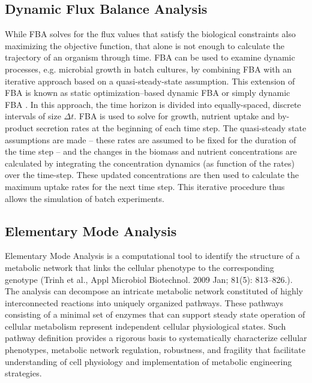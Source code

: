 \subsection{Dynamic Flux Balance Analysis}
While FBA solves for the flux values that satisfy the biological constraints also maximizing the objective function, that alone is not enough to calculate the trajectory of an organism through time. FBA can be used to examine dynamic processes, e.g. microbial growth in batch cultures, by combining FBA with an iterative approach based on a quasi-steady-state assumption. This extension of FBA is known as static optimization–based dynamic FBA or simply dynamic FBA \cite{Becker07}. In this approach, the time horizon is divided into equally-spaced, discrete intervals of size $\Delta t$. FBA is used to solve for growth, nutrient uptake and by-product secretion rates at the beginning of each time step. The quasi-steady state assumptions are made -- these rates are assumed to be fixed for the duration of the time step -- and the changes in the biomass and nutrient concentrations are calculated by integrating the concentration dynamics (as function of the rates) over the time-step. These updated concentrations are then used to calculate the maximum uptake rates for the next time step. This iterative procedure thus allows the simulation of batch experiments. %

\subsection{Elementary Mode Analysis}
Elementary Mode Analysis is a computational tool to identify the structure of a metabolic network that links the cellular phenotype to the corresponding genotype (Trinh et al., Appl Microbiol Biotechnol. 2009 Jan; 81(5): 813–826.). The analysis can decompose an intricate metabolic network constituted of highly interconnected reactions into uniquely organized pathways. These pathways consisting of a minimal set of enzymes that can support steady state operation of cellular metabolism represent independent cellular physiological states. Such pathway definition provides a rigorous basis to systematically characterize cellular phenotypes, metabolic network regulation, robustness, and fragility that facilitate understanding of cell physiology and implementation of metabolic engineering strategies.

